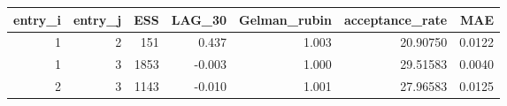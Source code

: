 \begin{longtable}{rrrrrrr}
\toprule
entry\_i & entry\_j & ESS & LAG\_30 & Gelman\_rubin & acceptance\_rate & MAE \\ 
\midrule
1 & 2 & 151 & 0.437 & 1.003 & 20.90750 & 0.0122 \\ 
1 & 3 & 1853 & -0.003 & 1.000 & 29.51583 & 0.0040 \\ 
2 & 3 & 1143 & -0.010 & 1.001 & 27.96583 & 0.0125 \\ 
\bottomrule
\end{longtable}

